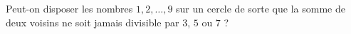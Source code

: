 Peut-on disposer les nombres $1, 2, \ldots, 9$ sur un cercle de sorte que la somme de deux voisins ne soit jamais divisible par $3$, $5$ ou $7$ ?
